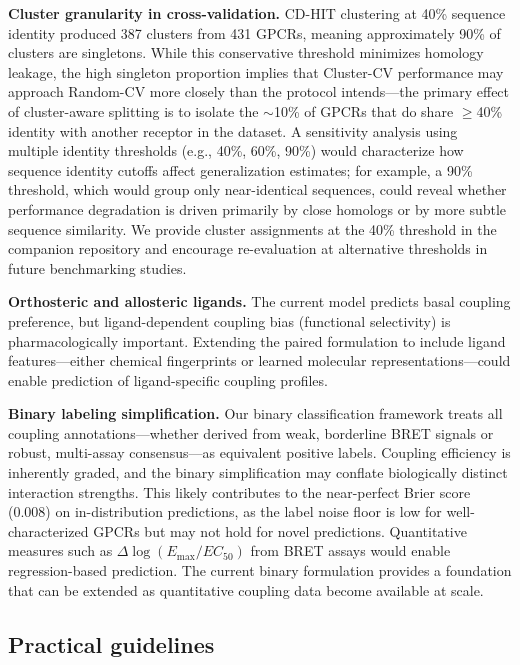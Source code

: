 \documentclass[11pt,a4paper]{article}
\begin{document}
\textbf{Cluster granularity in cross-validation.} CD-HIT clustering at 40\% sequence identity produced 387 clusters from 431 GPCRs, meaning approximately 90\% of clusters are singletons. While this conservative threshold minimizes homology leakage, the high singleton proportion implies that Cluster-CV performance may approach Random-CV more closely than the protocol intends---the primary effect of cluster-aware splitting is to isolate the $\sim$10\% of GPCRs that do share $\ge$40\% identity with another receptor in the dataset. A sensitivity analysis using multiple identity thresholds (e.g., 40\%, 60\%, 90\%) would characterize how sequence identity cutoffs affect generalization estimates; for example, a 90\% threshold, which would group only near-identical sequences, could reveal whether performance degradation is driven primarily by close homologs or by more subtle sequence similarity. We provide cluster assignments at the 40\% threshold in the companion repository and encourage re-evaluation at alternative thresholds in future benchmarking studies.

\textbf{Orthosteric and allosteric ligands.} The current model predicts basal coupling preference, but ligand-dependent coupling bias (functional selectivity) is pharmacologically important. Extending the paired formulation to include ligand features---either chemical fingerprints or learned molecular representations---could enable prediction of ligand-specific coupling profiles.

\textbf{Binary labeling simplification.} Our binary classification framework treats all coupling annotations---whether derived from weak, borderline BRET signals or robust, multi-assay consensus---as equivalent positive labels. Coupling efficiency is inherently graded, and the binary simplification may conflate biologically distinct interaction strengths. This likely contributes to the near-perfect Brier score (0.008) on in-distribution predictions, as the label noise floor is low for well-characterized GPCRs but may not hold for novel predictions. Quantitative measures such as $\Delta \log(E_{\text{max}}/EC_{50})$ from BRET assays would enable regression-based prediction. The current binary formulation provides a foundation that can be extended as quantitative coupling data become available at scale.

\subsection{Practical guidelines}
\end{document}
